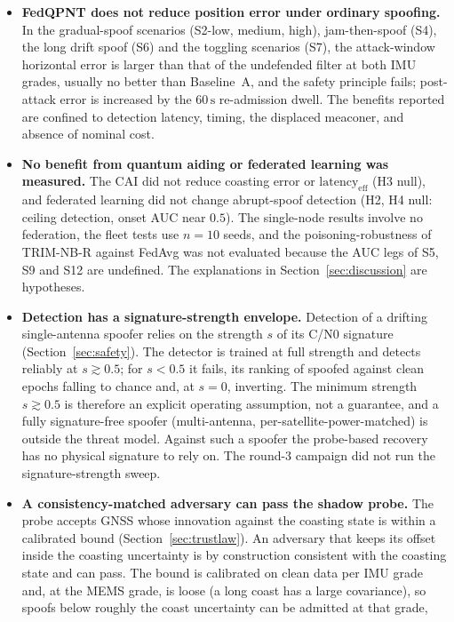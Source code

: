 \documentclass[journal]{IEEEtran}
\begin{document}
\begin{itemize}
\item \textbf{FedQPNT does not reduce position error under ordinary spoofing.} In the gradual-spoof scenarios (S2-low, medium, high), jam-then-spoof (S4), the long drift spoof (S6) and the toggling scenarios (S7), the attack-window horizontal error is larger than that of the undefended filter at both IMU grades, usually no better than Baseline~A, and the safety principle fails; post-attack error is increased by the $60\,\mathrm{s}$ re-admission dwell. The benefits reported are confined to detection latency, timing, the displaced meaconer, and absence of nominal cost.
\item \textbf{No benefit from quantum aiding or federated learning was measured.} The CAI did not reduce coasting error or $\mathrm{latency}_{\mathrm{eff}}$ (H3 null), and federated learning did not change abrupt-spoof detection (H2, H4 null: ceiling detection, onset AUC near $0.5$). The single-node results involve no federation, the fleet tests use $n=10$ seeds, and the poisoning-robustness of TRIM-NB-R against FedAvg was not evaluated because the AUC legs of S5, S9 and S12 are undefined. The explanations in Section~\ref{sec:discussion} are hypotheses.
\item \textbf{Detection has a signature-strength envelope.} Detection of a drifting single-antenna spoofer
  relies on the strength $s$ of its C/N0 signature (Section~\ref{sec:safety}). The detector is trained at
  full strength and detects reliably at $s \gtrsim 0.5$; for $s < 0.5$ it fails, its ranking of spoofed
  against clean epochs falling to chance and, at $s = 0$, inverting. The minimum strength $s \gtrsim 0.5$ is
  therefore an explicit operating assumption, not a guarantee, and a fully signature-free spoofer
  (multi-antenna, per-satellite-power-matched) is outside the threat model. Against such a spoofer the
  probe-based recovery has no physical signature to rely on. The round-3 campaign did not run the signature-strength sweep.
\item \textbf{A consistency-matched adversary can pass the shadow probe.} The probe accepts GNSS whose
  innovation against the coasting state is within a calibrated bound (Section~\ref{sec:trustlaw}). An adversary
  that keeps its offset inside the coasting uncertainty is by construction consistent with the coasting state
  and can pass. The bound is calibrated on clean data per IMU grade and, at the MEMS grade, is loose (a long
  coast has a large covariance), so spoofs below roughly the coast uncertainty can be admitted at that grade,

\end{itemize}
\end{document}
